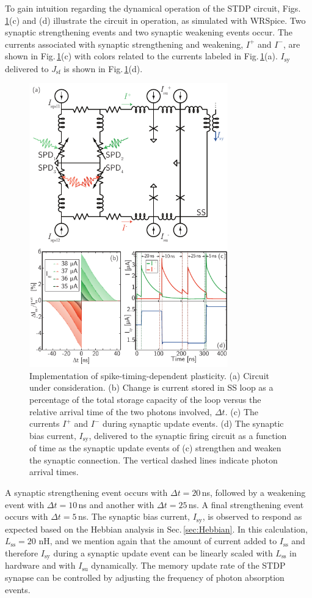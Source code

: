 \documentclass[twocolumn]{article}
\begin{document}
To gain intuition regarding the dynamical operation of the STDP circuit, Figs.\,\ref{fig:synapticPlasticity_stdp}(c) and (d) illustrate the circuit in operation, as simulated with WRSpice. Two synaptic strengthening events and two synaptic weakening events occur. The currents associated with synaptic strengthening and weakening, $I^+$ and $I^-$, are shown in Fig.\,\ref{fig:synapticPlasticity_stdp}(c) with colors related to the currents labeled in Fig.\,\ref{fig:synapticPlasticity_stdp}(a). $I_{\mathrm{sy}}$ delivered to $J_{\mathrm{sf}}$ is shown in Fig.\,\ref{fig:synapticPlasticity_stdp}(d). 
\begin{figure}[t!]
	\centerline{\includegraphics[width=8.6cm]{_synapticPlasticity_stdp_small.pdf}}
	\caption{\label{fig:synapticPlasticity_stdp}Implementation of spike-timing-dependent plasticity. (a) Circuit under consideration. (b) Change is current stored in SS loop as a percentage of the total storage capacity of the loop versus the relative arrival time of the two photons involved, $\Delta t$.  (c) The currents $I^+$ and $I^-$ during synaptic update events. (d) The synaptic bias current, $I_{\mathrm{sy}}$, delivered to the synaptic firing circuit as a function of time as the synaptic update events of (c) strengthen and weaken the synaptic connection. The vertical dashed lines indicate photon arrival times.}
\end{figure}
A synaptic strengthening event occurs with $\Delta t = 20$\,ns, followed by a weakening event with $\Delta t = 10$\,ns and another with $\Delta t = 25$\,ns. A final strengthening event occurs with $\Delta t = 5$\,ns. The synaptic bias current, $I_{\mathrm{sy}}$, is observed to respond as expected based on the Hebbian analysis in Sec.\,\ref{sec:Hebbian}. In this calculation, $L_{\mathrm{ss}} = 20$ nH, and we mention again that the amount of current added to $I_{\mathrm{ss}}$ and therefore $I_{\mathrm{sy}}$ during a synaptic update event can be linearly scaled with $L_{\mathrm{ss}}$ in hardware and with $I_{\mathrm{su}}$ dynamically. The memory update rate of the STDP synapse can be controlled by adjusting the frequency of photon absorption events.
\end{document}

